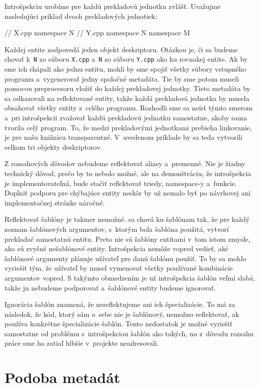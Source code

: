 Introšpekciu urobíme pre každú prekladovú jednotku zvlášť. Uvažujme nasledujúci príklad dvoch prekladových jednotiek:
\begin{code}
// X.cpp
namespace N {}
// Y.cpp
namespace N {} namespace M {}
\end{code}
Každej entite zodpovedá jeden objekt deskriptoru. Otázkou je, či sa budeme chovať k~\texttt{N} zo súboru \texttt{X.cpp} a~\texttt{N} zo súboru \texttt{Y.cpp} ako ku rovnakej entite. Ak by sme ich chápali ako jednu entitu, mohli by sme spojiť všetky súbory vstupného programu a~vygenerovať jedny spoločné metadáta. Tie by sme potom museli pomocou preprocesoru vložiť do každej prekladovej jednotky. Tieto metadáta by sa odkazovali na reflektované entity, takže každá prekladová jednotka by musela obsahovať všetky entity z~celého programu. Rozhodli sme sa neísť týmto smerom a~pri introšpekcii zvažovať každú prekladovú jednotku samostatne, akoby sama tvorila celý program. To, že medzi prekladovými jednotkami prebieha linkovanie, je pre našu knižnicu transparentné. V~uvedenom príklade by sa teda vytvorili celkom tri objekty deskriptorov.

Z rozsahových dôvodov nebudeme reflektovať aliasy a~premenné. Nie je žiadny technický dôvod, prečo by to nebolo možné, ale na demonštráciu, že introšpekcia je implementovateľná, bude stačiť reflektovať triedy, namespace-y a~funkcie. Doplniť podporu pre chýbajúce entity neskôr by už nemalo byť po návrhovej ani implementačnej stránke náročné.

Reflektovať šablóny je takmer nemožné. \Cpp{} sa chová ku šablónam tak, že pre každý zoznam šablónových argumentov, s~ktorým bola šablóna použitá, vytvorí prekladač samostatnú entitu. Preto nie sú šablóny entitami v~tom istom zmysle, ako sú zvyšné nešablónové entity. Introšpekcia nemôže vopred vedieť, aké šablónové argumenty plánuje užívateľ pre danú šablónu použiť. To by sa mohlo vyriešiť tým, že užívateľ by musel vymenovať všetky používané kombinácie argumentov vopred. S takýmto obmedzením je už introšpekcia šablón veľmi slabá, takže ju nebudeme podporovať a~šablónové entity budeme ignorovať.

Ignorácia šablón znamená, že nereflektujeme ani ich špecializácie. To má za následok, že kód, ktorý sám o~sebe nie je šablónový, nemožno reflektovať, ak používa konkrétne špecializácie šablón. Tento nedostatok je možné vyriešiť samostatne od problému s~introšpekciou šablón ako takých, no z~dôvodu rozsahu práce sme ho zatiaľ hlbšie v~projekte neadresovali.

\section{Podoba metadát} \label{metadata}

